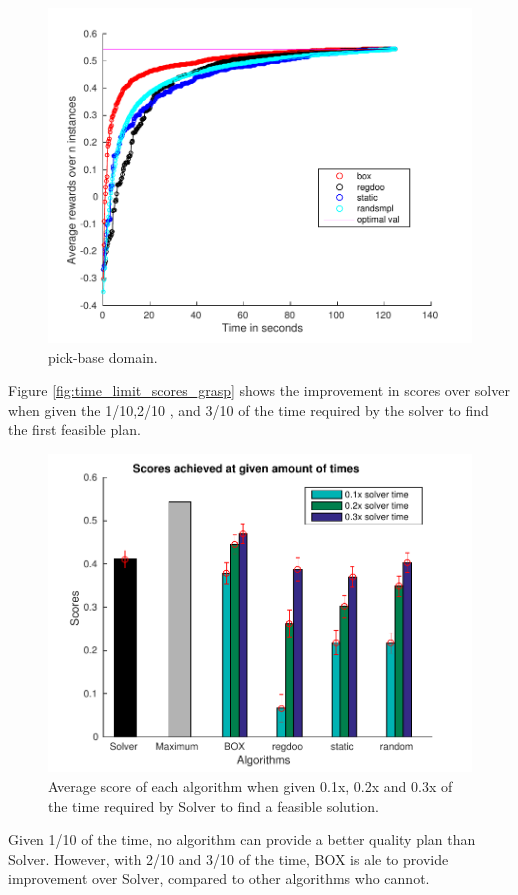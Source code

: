 \begin{figure}[htb]
\centering
\includegraphics[scale=0.5]{./figures/pick-place_vs_t.pdf}
\caption{ pick-base domain.}
\label{fig:pick-base_vs_t}
\end{figure} 

\iffalse

Figure \ref{fig:time_limit_scores_grasp} shows the improvement in scores
over solver when given the 1/10,2/10 , and 3/10 of the time
 required by the solver to find the first feasible plan.
\begin{figure}[htb]
\centering
\includegraphics[scale=0.5]{./figures/pick-place_opt_plot.pdf}
\caption{ Average score of each algorithm when given 0.1x, 0.2x and 0.3x of the time required by Solver to find a feasible solution. }
\label{fig:opt_plot_pick_base}
\end{figure} 
Given 1/10 of the time, no algorithm can provide a better quality
plan than Solver. However, with 2/10 and 3/10 
of the time, BOX is ale to provide improvement over Solver, compared
to other algorithms who cannot.


